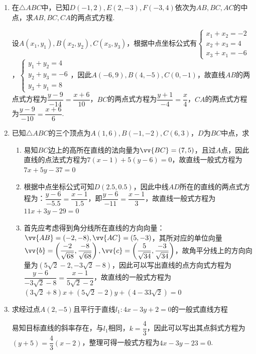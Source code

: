 \begin{enumerate}
    \item 在$\triangle ABC$中，已知$D(-1, 2), E(2, -3), F(-3, 4)$依次为$AB, BC, AC$的中点，求$AB, BC, CA$的两点式方程.
    \begin{jieda}
        设$A(x_1, y_1), B(x_2, y_2), C(x_3, y_3)$，根据中点坐标公式有$\left \{ \begin{array}{l}
             x_1 + x_2 = -2 \\
             x_2 + x_3 = 4 \\
             x_3 + x_1 = -6
        \end{array}\right.$，$\left \{ \begin{array}{l}
             y_1 + y_2 = 4 \\
             y_2 + y_3 = -6 \\
             y_3 + y_1 = 8
        \end{array}\right.$，因此$A(-6, 9), B(4, -5), C(0, -1)$，故直线$AB$的两点式方程为$\dfrac{y - 9}{-14} = \dfrac{x+6}{10}$，$BC$的两点式方程为$\dfrac{y+1}{-4} = \dfrac{x}{4}$，$CA$的两点式方程为$\dfrac{y-9}{-10} = \dfrac{x+6}{6}$.
    \end{jieda}
    \item 已知$\triangle ABC$的三个顶点为$A(1, 6), B(-1, -2), C(6, 3)$，$D$为$BC$中点，求
    \begin{jieda}
        \begin{enumerate}
            \item 易知$BC$边上的高所在直线的法向量为$\vv{BC} = (7, 5)$，且过$A$点，因此直线的点法式方程为$7(x - 1)+5(y-6) = 0$，故直线一般式方程为$7x+5y-37=0$
            \item 根据中点坐标公式可知$D(2.5, 0.5)$，因此中线$AD$所在的直线的两点式方程为：$\dfrac{y - 6}{-5.5} = \dfrac{x - 1}{1.5}$，即$\dfrac{y - 6}{-11} = \dfrac{x-1}{3}$，故直线一般式方程为$11x+3y-29 = 0$
            \item 首先应考虑得到角分线所在直线的方向向量：$\vv{AB} = (-2, -8), \vv{AC} = (5, -3)$，其所对应的单位向量$\vv{b} = \left(\dfrac{-2}{\sqrt{68}}, \dfrac{-8}{\sqrt{68}}\right), \vv{c} = \left(\dfrac{5}{\sqrt{34}}, \dfrac{-3}{\sqrt{34}}\right)$，故角平分线上的方向向量为$\left(5\sqrt{2}-2, -3\sqrt{2}-8\right)$，因此可以写出直线的点方向式方程为$\dfrac{y-6}{-3\sqrt{2}-8} = \dfrac{x-1}{5\sqrt{2}-2}$，故直线的一般式方程为$(3\sqrt{2}+8)x+(5\sqrt{2}-2)y+(4-33\sqrt{2})=0$
        \end{enumerate}
    \end{jieda}
    \item 求经过点$A(2, -5)$且平行于直线$l_1: 4x-3y+2=0$的一般式直线方程
    \begin{jieda}
        易知目标直线的斜率存在，与$l_1$相同，$k = \dfrac{4}{3}$，因此可以写出其点斜式方程为$(y+5) = \dfrac{4}{3}(x-2)$，整理可得一般式方程为$4x-3y-23=0$.
    \end{jieda}
    

\end{enumerate}
